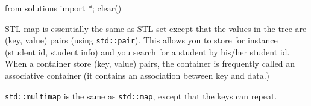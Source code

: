 \begin{python0}
from solutions import *; clear()
\end{python0}

STL map is essentially the same as STL set except that
the values in the tree are (key, value) pairs (using \verb!std::pair!).
This allows you to store for instance (student id, student info)
and you search for a student by his/her student id.
When a container store (key, value) pairs, the container is
frequently called an associative container (it contains
an association between key and data.)



\verb!std::multimap! is the same as \verb!std::map!,
except that the keys can repeat.
